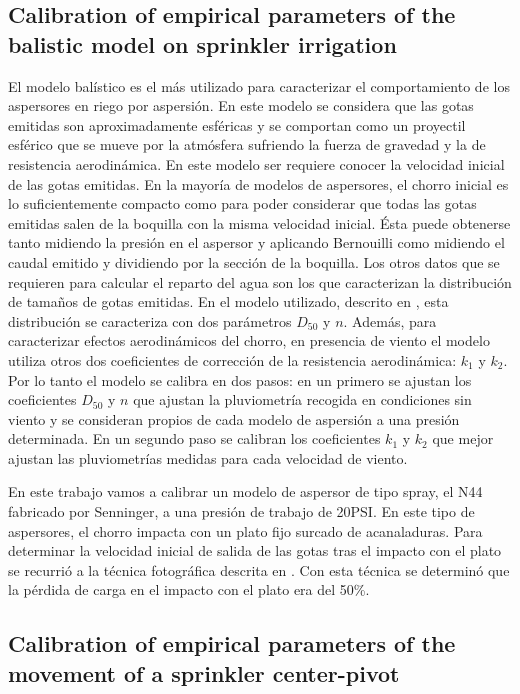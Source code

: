 \documentclass[review,authoryear]{elsarticle}
\begin{document}
\subsection{Calibration of empirical parameters of the balistic model on
sprinkler irrigation}

El modelo balístico \citep{Fukui80,Playan06} es el más utilizado para
caracterizar el comportamiento de los aspersores en riego por aspersión. En este
modelo se considera que las gotas emitidas son aproximadamente esféricas y se
comportan como un proyectil esférico que se mueve por la atmósfera sufriendo la
fuerza de gravedad y la de resistencia aerodinámica. En este modelo ser requiere
conocer la velocidad inicial de las gotas emitidas. En la mayoría de modelos de aspersores, el chorro inicial es lo suficientemente compacto como para poder
considerar que todas las gotas emitidas salen de la boquilla con la misma
velocidad inicial. Ésta puede obtenerse tanto midiendo la presión en el aspersor
y aplicando Bernouilli como midiendo el caudal emitido y dividiendo por la
sección de la boquilla. Los otros datos que se requieren para calcular el
reparto del agua son los que caracterizan la distribución de tamaños de gotas
emitidas. En el modelo utilizado, descrito en \citet{Playan06}, esta
distribución se caracteriza con dos parámetros $D_{50}$ y $n$. Además, para
caracterizar efectos aerodinámicos del chorro, en presencia de viento el modelo
utiliza otros dos coeficientes de corrección de la resistencia aerodinámica:
$k_1$ y $k_2$.
Por lo tanto el modelo se calibra en dos pasos: en un primero se ajustan los
coeficientes $D_{50}$ y $n$ que ajustan la pluviometría recogida en condiciones
sin viento y se consideran propios de cada modelo de aspersión a una presión
determinada. En un segundo paso se calibran los coeficientes $k_1$ y $k_2$ que
mejor ajustan las pluviometrías medidas para cada velocidad de viento.

En este trabajo vamos a calibrar un modelo de aspersor de tipo spray, el N44
fabricado por Senninger, a una presión de trabajo de 20PSI. En este tipo de
aspersores, el chorro impacta con un plato fijo surcado de acanaladuras. Para
determinar la velocidad inicial de salida de las gotas tras el impacto con el
plato se recurrió a la técnica fotográfica descrita en \citet{Salvador09}. Con
esta técnica se determinó que la pérdida de carga en el impacto con el plato era
del 50\%.

\subsection{Calibration of empirical parameters of the movement of a sprinkler
center-pivot}
\end{document}
